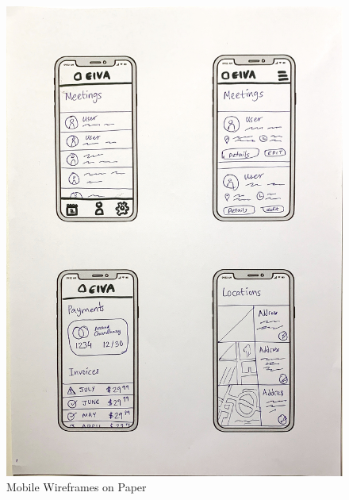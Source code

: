 \documentclass{article}
\begin{document}
\begin{figure}
\begin{minipage}{.5\textwidth}
		\includegraphics[width=1\linewidth]{drawing-phone-4.jpg}
	\end{minipage}
	\caption{Mobile Wireframes on Paper}
\end{figure}
\end{document}
